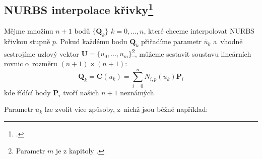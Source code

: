 \subsection[NURBS interpolace křivky]{NURBS interpolace křivky\footcite[kapitola 9.2.1]{The_NURBS_Book}}\label{section: interpolace křivky}
Mějme množinu $n + 1$ bodů $\{\bm{Q}_k\}$ $k = 0, \ldots, n$, které chceme
interpolovat NURBS křivkou stupně $p$. Pokud každému bodu $\bm{Q}_k$ přiřadíme
parametr $\bar{u}_k$ a~vhodně sestrojíme uzlový vektor $\bm{U} = \{u_0, \ldots,
    u_m\}$\footnote{Parametr $m$ je z kapitoly .}, můžeme sestavit soustavu lineárních rovnic o~rozměru $(n + 1)\times(n +
    1)$:
\begin{equation}
    \bm{Q}_k = \bm{C}(\bar{u}_k) = \sum_{i = 0}^{n}N_{i,p}(\bar{u}_k)\bm{P}_i
\end{equation}
kde řídící body $\bm{P}_i$ tvoří našich $n + 1$ neznámých.\par
\pagebreak
Parametr $\bar{u}_k$ lze zvolit více způsoby, z~nichž jsou běžné například:
